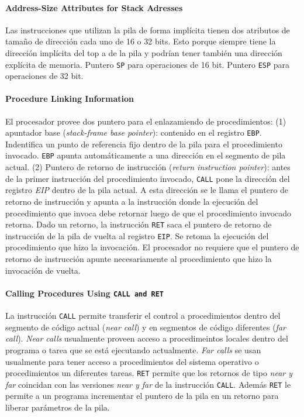 \paragraph{Address-Size Attributes for Stack Adresses}
Las instrucciones que utilizan la pila de forma implícita tienen dos atributos de tamaño de dirección cada uno de 16 o 32 bits. Esto porque siempre tiene la dirección implícita del top a de la pila y podrían tener también una dirección explícita de memoria. Puntero \texttt{SP} para operaciones de 16 bit. Puntero \texttt{ESP} para operaciones de 32 bit. 

\paragraph{Procedure Linking Information}
El procesador provee dos puntero para el enlazamiendo de procedimientos: (1) apuntador base (\textit{stack-frame base pointer}): contenido en el registro \texttt{EBP}. Indentifica un punto de referencia fijo dentro de la pila para el procedimiento invocado. \texttt{EBP} apunta automáticamente a una dirección en el segmento de pila actual. (2) Puntero de retorno de instrucción (\textit{return instruction pointer}): antes de la primer instrucción del procedimiento invocado, \texttt{CALL} pone la dirección del registro \textit{EIP} dentro de la pila actual. A esta dirección se le llama el puntero de retorno de instrucción y apunta a la instrucción donde la ejecución del procedimiento que invoca debe retornar luego de que el procedimiento invocado retorna. Dado un retorno, la instrucción \texttt{RET} saca el puntero de retorno de instrucción de la pila de vuelta al registro \texttt{EIP}. Se retoma la ejecución del procedimiento que hizo la invocación. El procesador no requiere que el puntero de retorno de instrucción apunte necesariamente al procedimiento que hizo la invocación de vuelta.

\paragraph{\textnormal{\textbf{Calling Procedures Using \texttt{CALL \textnormal{\textbf{and}} RET}}}}
La instrucción \texttt{CALL} permite transferir el control a procedimientos dentro del segmento de código actual (\textit{near call}) y en segmentos de código diferentes (\textit{far call}). \textit{Near calls} usualmente proveen acceso a procedimeintos locales dentro del programa o tarea que se está ejecutando actualmente. \textit{Far calls} se usan usualmente para tener acceso a procedimientos del sistema operativo o procedimientos un diferentes tareas. \texttt{RET} permite que los retornos de tipo \textit{near \textnormal{y} far} coincidan con las versiones \textit{near \textnormal{y} far} de la instrucción \texttt{CALL}. Además \texttt{RET} le permite a un programa incrementar el puntero de la pila en un retorno para liberar parámetros de la pila. 

